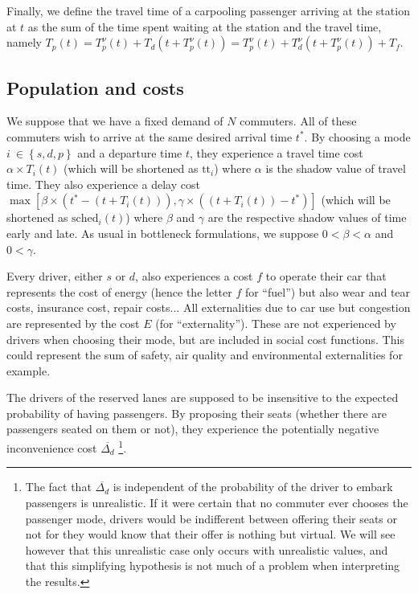 \documentclass[english, a4paper]{article}
\theoremstyle{plain}
\theoremstyle{definition}
\theoremstyle{remark}
\begin{document}
Finally, we define the travel time of a carpooling passenger arriving at the station at $t$ as the sum of the time spent waiting at the station and the travel time, namely $T_p(t) = T^{\nu}_p(t) + T_d(t + T^{\nu}_p(t)) = T^{\nu}_p(t) + T^{\nu}_d(t + T^{\nu}_p(t)) + T_f$.


\subsection{Population and costs}


We suppose that we have a fixed demand of $N$ commuters. All of these commuters wish to arrive at the same desired arrival time $t^*$. By choosing a mode $i\ \in \left\{ s, d, p \right\}$ and a departure time $t$, they experience a travel time cost $\alpha \times T_i(t)$ (which will be shortened as $\text{tt}_i$) where $\alpha$ is the shadow value of travel time. They also experience a delay cost $\max [\beta \times (t^* - (t + T_i(t))), \gamma \times ((t + T_i(t)) - t^*)]$ (which will be shortened as $\text{sched}_i(t)$) where $\beta$ and $\gamma$ are the respective shadow values of time early and late. As usual in bottleneck formulations, we suppose $0 < \beta < \alpha$ and $0 < \gamma$. 

Every driver, either $s$ or $d$, also experiences a cost $f$ to operate their car that represents the cost of energy (hence the letter $f$ for ``fuel'') but also wear and tear costs, insurance cost, repair costs... All externalities due to car use but congestion are represented by the cost $E$ (for ``externality''). These are not experienced by drivers when choosing their mode, but are included in social cost functions. This could represent the sum of safety, air quality and environmental externalities for example.

The drivers of the reserved lanes are supposed to be insensitive to the expected probability of having passengers. By proposing their seats (whether there are passengers seated on them or not), they experience the potentially negative inconvenience cost $\overline{\Delta_d}$ \footnote{The fact that $\overline{\Delta_d}$ is independent of the probability of the driver to embark passengers is unrealistic. If it were certain that no commuter ever chooses the passenger mode, drivers would be indifferent between offering their seats or not for they would know that their offer is nothing but virtual. We will see however that this unrealistic case only occurs with unrealistic values, and that this simplifying hypothesis is not much of a problem when interpreting the results.}.
\end{document}
